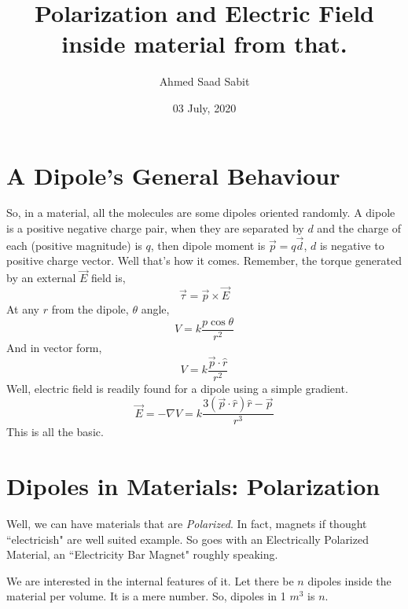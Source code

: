 \documentclass[12pt,a4paper]{memoir}
\author{Ahmed Saad Sabit}
\date{03 July, 2020}
\title{Polarization and Electric Field inside material from that.}
\begin{document}
\graphicspath{{\Pics}}
 \maketitle
 \section{A Dipole's General Behaviour}
So, in a material, all the molecules are some dipoles oriented randomly. A dipole is a positive negative charge pair, when they are separated by $d$  and the charge of each (positive magnitude) is $q$, then dipole moment is $\vec{p} = q \vec{d}$, $d$ is negative to positive charge vector. Well that's how it comes. Remember, the torque generated by an external $\vec{E}$ field is,
\begin{equation}
\vec{\tau} = \vec{p} \times \vec{E}
\end{equation}
At any $r$ from the dipole, $\theta$ angle,
\begin{equation}
V = k\frac{p \cos \theta }{r^2}
\end{equation}
And in vector form,
\begin{equation}
V = k \frac{\vec{p} \cdot \hat{r}}{r^2}
\end{equation}
Well, electric field is readily found for a dipole using a simple gradient.
\begin{equation}
\vec{E} = - \nabla V = k \frac{3 ( \vec{p } \cdot \hat{r}  ) \hat{r}  - \vec{p} }{r^3}
\end{equation}
This is all the basic. \\
\section{Dipoles in Materials: Polarization}
Well, we can have materials that are \emph{Polarized}. In fact, magnets if thought ``electricish" are well suited example. So goes with an Electrically Polarized Material, an ``Electricity Bar Magnet" roughly speaking. 

We are interested in the internal features of it. Let there be $n$ dipoles inside the material per volume. It is a mere number. So, dipoles in 1 $m^3$ is $n$. 
\end{document}
